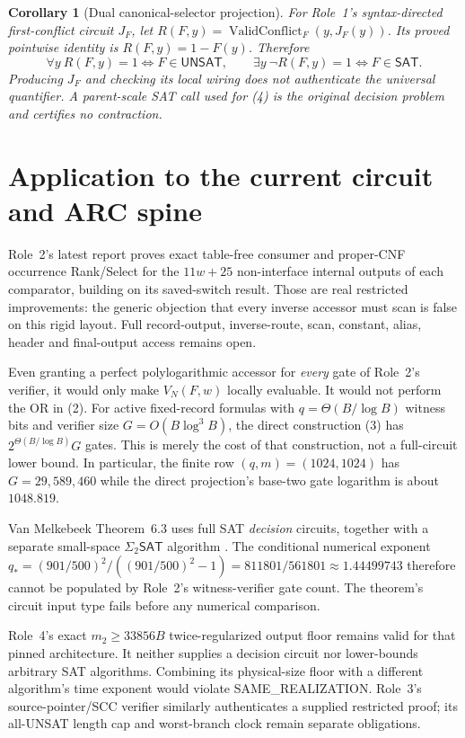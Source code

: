 \documentclass[11pt]{article}
\newtheorem{corollary}[theorem]{Corollary}
\newcommand{\SAT}{\mathsf{SAT}}
\newcommand{\UNSAT}{\mathsf{UNSAT}}
\begin{document}
\begin{corollary}[Dual canonical-selector projection]
For Role~1's syntax-directed first-conflict circuit $J_F$, let
$R(F,y)=\operatorname{ValidConflict}_F(y,J_F(y))$.  Its proved pointwise
identity is $R(F,y)=1-F(y)$.  Therefore
\[
 \forall y\ R(F,y)=1\iff F\in\UNSAT,
 \qquad
 \exists y\ \neg R(F,y)=1\iff F\in\SAT.                           \tag{4}
\]
Producing $J_F$ and checking its local wiring does not authenticate the
universal quantifier.  A parent-scale SAT call used for (4) is the original
decision problem and certifies no contraction.
\end{corollary}

\section{Application to the current circuit and ARC spine}
Role~2's latest report proves exact table-free consumer and proper-CNF
occurrence Rank/Select for the $11w+25$ non-interface internal outputs of
each comparator, building on its saved-switch result.  Those are real
restricted improvements: the generic objection that every inverse accessor
must scan is false on this rigid layout.  Full record-output, inverse-route,
scan, constant, alias, header and final-output access remains open.

Even granting a perfect polylogarithmic accessor for \emph{every} gate of
Role~2's verifier, it would only make $V_N(F,w)$ locally evaluable.  It would
not perform the OR in (2).  For active fixed-record formulas with
$q=\Theta(B/\log B)$ witness bits and verifier size
$G=O(B\log^3 B)$, the direct construction (3) has
$2^{\Theta(B/\log B)}G$ gates.  This is merely the cost of that construction,
not a full-circuit lower bound.  In particular, the finite row
$(q,m)=(1024,1024)$ has $G=29{,}589{,}460$ while the direct projection's
base-two gate logarithm is about $1048.819$.

Van Melkebeek Theorem~6.3 uses full SAT \emph{decision} circuits, together
with a separate small-space $\Sigma_2\SAT$ algorithm \cite{vm2007}.  The
conditional numerical exponent
$q_*=(901/500)^2/((901/500)^2-1)=811801/561801\approx1.44499743$
therefore cannot be populated by Role~2's witness-verifier gate count.  The
theorem's circuit input type fails before any numerical comparison.

Role~4's exact $m_2\ge33856B$ twice-regularized output floor remains valid
for that pinned architecture.  It neither supplies a decision circuit nor
lower-bounds arbitrary SAT algorithms.  Combining its physical-size floor
with a different algorithm's time exponent would violate SAME\_REALIZATION.
Role~3's source-pointer/SCC verifier similarly authenticates a supplied
restricted proof; its all-UNSAT length cap and worst-branch clock remain
separate obligations.
\end{document}
